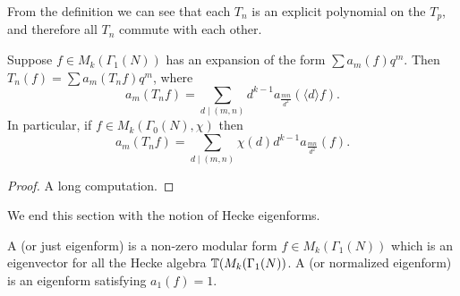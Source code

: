 From the definition we can see that each $T_n$ is an explicit polynomial on the $T_p$, and therefore all $T_n$ commute with each other.

\begin{theorem}
  Suppose $f\in M_k(\Gamma_1(N))$ has an expansion of the form $\sum a_m(f)q^m$. Then $T_n(f)=\sum a_m(T_nf) q^m$, where
\[
a_m(T_nf) = \sum_{d\mid (m,n)} d^{k-1}a_{\frac{mn}{d^2}}(\langle d\rangle f).
\]
In particular, if $f\in M_k(\Gamma_0(N),\chi)$ then
\[
a_m(T_nf)=\sum_{d\mid (m,n)} \chi(d) d^{k-1} a_{\frac{mn}{d^2}}(f).
\]
\end{theorem}
\begin{proof}
  A long computation.
\end{proof}

We end this section with the notion of Hecke eigenforms.
\begin{definition}
  A  (or just eigenform) is a non-zero modular form $f\in M_k(\Gamma_1(N))$ which is an eigenvector for all the Hecke algebra $\mathbb{T}(M_k(\Gamma_1(N))$. A  (or normalized eigenform) is an eigenform satisfying $a_1(f)=1$.
\end{definition}

